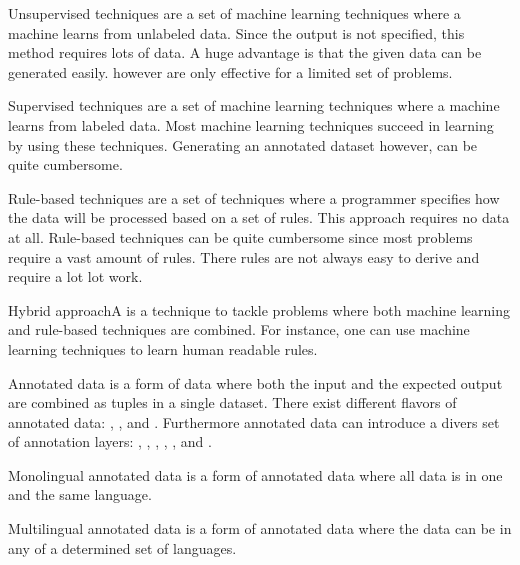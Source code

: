 \begin{df}{Unsupervised techniques}\sb{} are a set of machine learning techniques where a machine learns from unlabeled data. Since the output is not specified, this method requires lots of data. A huge advantage is that the given data can be generated easily. \sb{} however are only effective for a limited set of problems.
\end{df}
\begin{df}{Supervised techniques}\sb{} are a set of machine learning techniques where a machine learns from labeled data. Most machine learning techniques succeed in learning by using these techniques. Generating an annotated dataset however, can be quite cumbersome.
\end{df}
\begin{df}{Rule-based techniques}\sb{} are a set of techniques where a programmer specifies how the data will be processed based on a set of rules. This approach requires no data at all. Rule-based techniques can be quite cumbersome since most problems require a vast amount of rules. There rules are not always easy to derive and require a lot lot work.
\end{df}
\begin{df}{Hybrid approach}A \sb{} is a technique to tackle problems where both machine learning and rule-based techniques are combined. For instance, one can use machine learning techniques to learn human readable rules.
\end{df}
\begin{df}{Annotated data}\sb{} is a form of data where both the input and the expected output are combined as tuples in a single dataset. There exist different flavors of annotated data: , ,  and . Furthermore annotated data can introduce a divers set of annotation layers: , , , , ,  and .
\end{df}
\begin{df}{Monolingual annotated data}\sb{} is a form of annotated data where all data is in one and the same language.
\end{df}
\begin{df}{Multilingual annotated data}\sb{} is a form of annotated data where the data can be in any of a determined set of languages.
\end{df}
